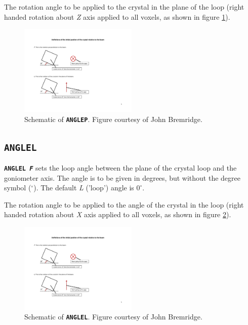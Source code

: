\documentclass[a4paper]{article}
\newcommand{\Keyword}[1]{\texttt{\textbf{#1}}\xspace}
\begin{document}
The rotation angle to be applied to the crystal in the plane of the loop (right handed rotation about \textit{Z} axis applied to all voxels, as shown in figure \ref{fig:angleP}). 
\begin{figure}[h!]
\centering
\includegraphics[width=0.5\textwidth]{Figs-for-Markus-from-JB-19-5-13-1.pdf}
\caption{Schematic of \Keyword{ANGLEP}. Figure courtesy of John Bremridge.}
\label{fig:angleP}
\end{figure}

\subsection{\Keyword{ANGLEL}}

\noindent \Keyword{ANGLEL \textit{F}}
sets the loop angle between the plane of the crystal loop and the goniometer axis. The angle is to be given in degrees, but without the degree symbol ($^\circ$). The default \textit{L} ('loop') angle is $0^\circ$.

The rotation angle to be applied to the angle of the crystal in the loop (right handed rotation about \textit{X} axis applied to all voxels, as shown in figure \ref{fig:angleL}).
\begin{figure}[h!]
\centering
\includegraphics[width=0.5\textwidth]{Figs-for-Markus-from-JB-19-5-13-2.pdf}
\caption{Schematic of \Keyword{ANGLEL}. Figure courtesy of John Bremridge.}
\label{fig:angleL}
\end{figure}

\newpage
\end{document}
